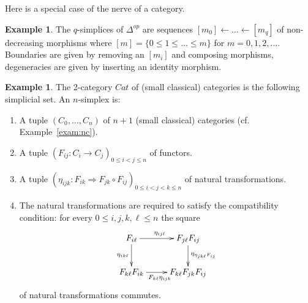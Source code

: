 \documentclass[a4paper]{amsart}
\numberwithin{figure}{section}
\theoremstyle{theorem}
\theoremstyle{definition}
\newtheorem{exam}[thm]{Example}
\begin{document}
Here is a special case of the nerve of a category.

\begin{exam} \label{exam:delta}
The $q$-simplices of $\Delta^{op}$ are sequences $[m_0] {\leftarrow} \dots {\leftarrow} [m_q]$ of non-decreasing morphisms where $[m]  = \{0 \leq 1 \leq \dots \leq m \}$ for $m = 0, 1, 2, \dots$. Boundaries are given by removing an $[m_i]$ and composing morphisms, degeneracies are given by inserting an identity morphism.\end{exam}

\begin{exam} \label{exam:2cat}
The 2-category $Cat$ of (small classical) categories is the following simplicial set. An $n$-simplex is:
\begin{enumerate}
 \item A tuple $(C_0, \dots, C_n)$ of $n+1$ (small classical) categories (cf. Example~\ref{exam:nc}).
 \item A tuple $(F_{ij}: C_{i} \to C_{j})_{0 \leq i < j \leq n}$ of functors.
 \item A tuple $(\eta_{ijk}: F_{ik} \Rightarrow F_{jk} \circ F_{ij})_{0 \leq i < j < k \leq n}$ of natural transformations. 
 \item The natural transformations are required to satisfy the compatibility condition: for every $0 \leq i, j, k, \ell \leq n$ the square 
 \[ \xymatrix{
F_{i\ell} \ar[r]^{\eta_{ij\ell}} \ar[d]_{\eta_{ik\ell}} & F_{j\ell}F_{ij} \ar[d]^{\eta_{\eta_{jk\ell} F_{ij}}} \\
F_{k\ell}F_{ik} \ar[r]_{F_{k\ell} \eta_{ijk}} &  F_{k\ell}F_{jk}F_{ij}
 } \]
of natural transformations commutes.
\end{enumerate}
\end{exam}
\end{document}
